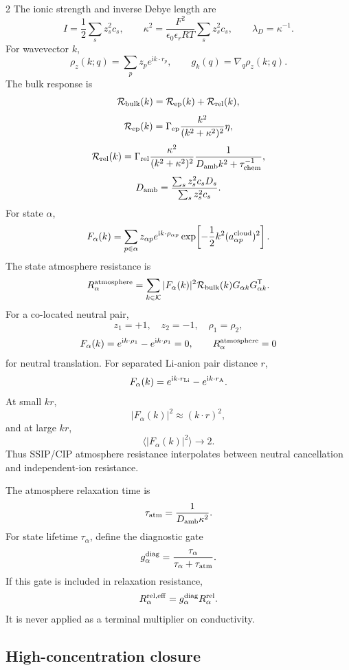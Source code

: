 \documentclass[10pt]{article}
\newcommand{\T}{\mathsf{T}}
\begin{document}
\begin{multicols}{2}
The ionic strength and inverse Debye length are
\[
I=\frac12\sum_s z_s^2c_s,
\qquad
\kappa^2=
\frac{F^2}{\epsilon_0\epsilon_rRT}\sum_s z_s^2c_s,
\qquad
\lambda_D=\kappa^{-1}.
\]
For wavevector \(k\),
\[
\rho_z(k;q)=\sum_p z_pe^{\mathrm i k\cdot r_p},
\qquad
g_k(q)=\nabla_q\rho_z(k;q).
\]
The bulk response is
\[
\mathcal R_{\rm bulk}(k)
=
\mathcal R_{\rm ep}(k)+\mathcal R_{\rm rel}(k),
\]
\[
\mathcal R_{\rm ep}(k)
=
\Gamma_{\rm ep}
\frac{k^2}{(k^2+\kappa^2)^2}\eta,
\]
\[
\mathcal R_{\rm rel}(k)
=
\Gamma_{\rm rel}
\frac{\kappa^2}{(k^2+\kappa^2)^2}
\frac{1}{D_{\rm amb}k^2+\tau_{\rm chem}^{-1}},
\]
\[
D_{\rm amb}
=
\frac{\sum_s z_s^2c_sD_s}{\sum_s z_s^2c_s}.
\]
For state \(\alpha\),
\[
F_\alpha(k)
=
\sum_{p\in\alpha}
z_{\alpha p}
e^{\mathrm i k\cdot\rho_{\alpha p}}
\exp\!\left[-\frac12k^2(a_{\alpha p}^{\rm cloud})^2\right].
\]
The state atmosphere resistance is
\[
R_\alpha^{\rm atmosphere}
=
\sum_{k\in\mathcal K}
|F_\alpha(k)|^2
\mathcal R_{\rm bulk}(k)
G_{\alpha k}G_{\alpha k}^\T.
\]
For a co-located neutral pair,
\[
z_1=+1,\quad z_2=-1,\quad \rho_1=\rho_2,
\]
\[
F_\alpha(k)=e^{\mathrm i k\cdot\rho_1}-e^{\mathrm i k\cdot\rho_1}=0,
\qquad
R_\alpha^{\rm atmosphere}=0
\]
for neutral translation. For separated Li-anion pair distance \(r\),
\[
F_\alpha(k)=e^{\mathrm i k\cdot r_{\rm Li}}
-e^{\mathrm i k\cdot r_{\rm A}}.
\]
At small \(kr\),
\[
|F_\alpha(k)|^2\approx(k\cdot r)^2,
\]
and at large \(kr\),
\[
\langle|F_\alpha(k)|^2\rangle\to2.
\]
Thus SSIP/CIP atmosphere resistance interpolates between neutral cancellation
and independent-ion resistance.

The atmosphere relaxation time is
\[
\tau_{\rm atm}=\frac{1}{D_{\rm amb}\kappa^2}.
\]
For state lifetime \(\tau_\alpha\), define the diagnostic gate
\[
g_\alpha^{\rm diag}
=
\frac{\tau_\alpha}{\tau_\alpha+\tau_{\rm atm}}.
\]
If this gate is included in relaxation resistance,
\[
R_\alpha^{{\rm rel},\rm eff}=g_\alpha^{\rm diag}R_\alpha^{\rm rel}.
\]
It is never applied as a terminal multiplier on conductivity.

\subsection{High-concentration closure}


\end{multicols}
\end{document}
